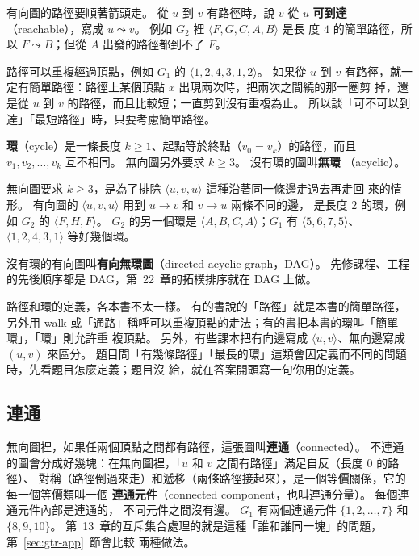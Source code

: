 有向圖的路徑要順著箭頭走。 從 $u$ 到 $v$ 有路徑時，說 $v$ 從 $u$ \textbf{可到達}
（reachable），寫成 $u \leadsto v$。 例如 $G_2$ 裡 $\langle F, G, C, A, B \rangle$ 是長
度 $4$ 的簡單路徑，所以 $F \leadsto B$；但從 $A$ 出發的路徑都到不了 $F$。

路徑可以重複經過頂點，例如 $G_1$ 的 $\langle 1, 2, 4, 3, 1, 2 \rangle$。 如果從 $u$ 到
$v$ 有路徑，就一定有簡單路徑：路徑上某個頂點 $x$ 出現兩次時，把兩次之間繞的那一圈剪
掉，還是從 $u$ 到 $v$ 的路徑，而且比較短；一直剪到沒有重複為止。 所以談「可不可以到
達」「最短路徑」時，只要考慮簡單路徑。

\begin{definition}[環]
\label{def:gtr-cycle}
\textbf{環}（cycle）是一條長度 $k \ge 1$、起點等於終點（$v_0 = v_k$）的路徑，而且
$v_1, v_2, \ldots, v_k$ 互不相同。 無向圖另外要求 $k \ge 3$。 沒有環的圖叫\textbf{無環}
（acyclic）。
\end{definition}

無向圖要求 $k \ge 3$，是為了排除 $\langle u, v, u \rangle$ 這種沿著同一條邊走過去再走回
來的情形。 有向圖的 $\langle u, v, u \rangle$ 用到 $u \to v$ 和 $v \to u$ 兩條不同的邊，
是長度 $2$ 的環，例如 $G_2$ 的 $\langle F, H, F \rangle$。 $G_2$ 的另一個環是
$\langle A, B, C, A \rangle$；$G_1$ 有 $\langle 5, 6, 7, 5 \rangle$、
$\langle 1, 2, 4, 3, 1 \rangle$ 等好幾個環。

沒有環的有向圖叫\textbf{有向無環圖}（directed acyclic graph，DAG）。 先修課程、工程
的先後順序都是 DAG，第~22~章的拓樸排序就在 DAG 上做。

\begin{examnote}
路徑和環的定義，各本書不太一樣。 有的書說的「路徑」就是本書的簡單路徑，另外用
walk 或「通路」稱呼可以重複頂點的走法；有的書把本書的環叫「簡單環」，「環」則允許重
複頂點。 另外，有些課本把有向邊寫成 $\langle u, v \rangle$、無向邊寫成 $(u, v)$ 來區分。
題目問「有幾條路徑」「最長的環」這類會因定義而不同的問題時，先看題目怎麼定義；題目沒
給，就在答案開頭寫一句你用的定義。
\end{examnote}

\subsection{連通}

無向圖裡，如果任兩個頂點之間都有路徑，這張圖叫\textbf{連通}（connected）。 不連通
的圖會分成好幾塊：在無向圖裡，「$u$ 和 $v$ 之間有路徑」滿足自反（長度 $0$ 的路徑）、
對稱（路徑倒過來走）和遞移（兩條路徑接起來），是一個等價關係，它的每一個等價類叫一個
\textbf{連通元件}（connected component，也叫連通分量）。 每個連通元件內部是連通的，
不同元件之間沒有邊。 $G_1$ 有兩個連通元件 $\{1, 2, \ldots, 7\}$ 和 $\{8, 9, 10\}$。
第~13~章的互斥集合處理的就是這種「誰和誰同一塊」的問題，第~\ref{sec:gtr-app}~節會比較
兩種做法。


